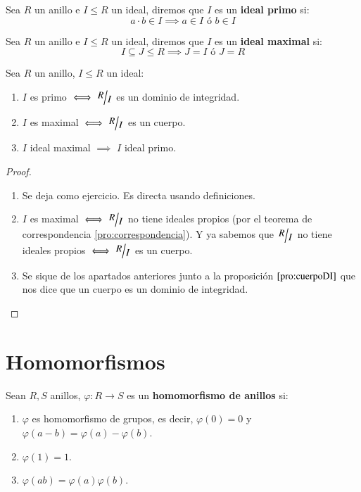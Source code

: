 \begin{dfn}
    Sea $R$ un anillo e $I \leq R$ un ideal, diremos que $I$ es un \textbf{ideal primo} si:
    $$
        a\cdot b \in I \implies a \in I \text{ ó } b \in I
    $$
\end{dfn}

\begin{dfn}
    Sea $R$ un anillo e $I \leq R$ un ideal, diremos que $I$ es un \textbf{ideal maximal} si:
    $$
        I \subseteq J \leq R \implies J = I \text { ó } J = R
    $$
\end{dfn}
\begin{thm}
    Sea $R$ un anillo, $I \leq R$ un ideal:\\
    \begin{enumerate}
        \item $I$ es primo $\iff \quo{R}{I}$ es un dominio de integridad.
        \item $I$ es maximal $\iff \quo{R}{I}$ es un cuerpo.
        \item $I$ ideal maximal $\implies$ $I$ ideal primo.
    \end{enumerate}
\end{thm}
\begin{proof}$ $
    \begin{enumerate}
        \item Se deja como ejercicio. Es directa usando definiciones.
        \item $I$ es maximal $\iff \quo{R}{I}$ no tiene ideales propios (por el teorema de correspondencia \ref{pro:correspondencia}). Y ya sabemos que $\quo{R}{I}$ no tiene ideales propios $\iff \quo{R}{I}$ es un cuerpo.
        \item Se sique de los apartados anteriores junto a la proposición $\ref{pro:cuerpoDI}$ que nos dice que un cuerpo es un dominio de integridad.
    \end{enumerate}
\end{proof}

\section{Homomorfismos}

\begin{dfn}
    Sean $R, S$ anillos, $\varphi: R \to S$ es un \textbf{homomorfismo de anillos} si:\\
    \begin{enumerate}
        \item $\varphi$ es homomorfismo de grupos, es decir, $\varphi(0) = 0$ y $\varphi(a - b) = \varphi(a) - \varphi(b)$.
        \item $\varphi(1) = 1$.
        \item $\varphi(ab) = \varphi(a)\varphi(b)$.
    \end{enumerate}
\end{dfn}

